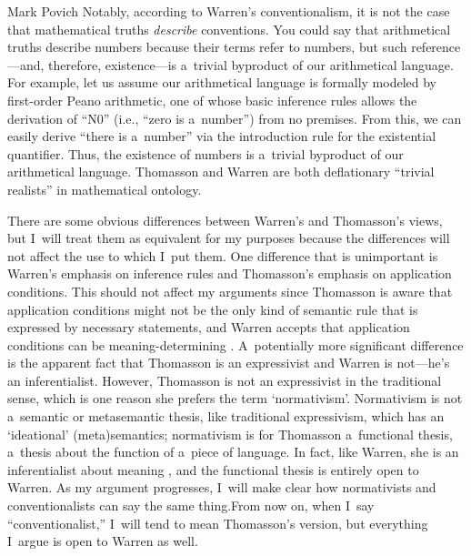 \begin{artengenv}{Mark Povich}
Notably, according to Warren's
\parencite*[][]{warren_shadows_2020} %
 conventionalism, it is not the case that mathematical truths \textit{describe} conventions. You could say that arithmetical truths describe numbers because their terms refer to numbers, but such reference---and, therefore, existence---is a~trivial byproduct of our arithmetical language. For example, let us assume our arithmetical language is formally modeled by first-order Peano arithmetic, one of whose basic inference rules allows the derivation of ``N0'' (i.e., ``zero is a~number'') from no premises. From this, we can easily derive ``there is a~number'' via the introduction rule for the existential quantifier. Thus, the existence of numbers is a~trivial byproduct of our arithmetical language. Thomasson and Warren are both deflationary ``trivial realists'' in mathematical ontology.

There are some obvious differences between Warren's and Thomasson's views, but I~will treat them as equivalent for my purposes because the differences will not affect the use to which I~put them. One difference that is unimportant is Warren's emphasis on inference rules and Thomasson's emphasis on application conditions. This should not affect my arguments since Thomasson is aware that application conditions might not be the only kind of semantic rule that is expressed by necessary statements, and Warren accepts that application conditions can be meaning-determining
\parencite[][]{warren_inferentialism_2022}. %
 A~potentially more significant difference is the apparent fact that Thomasson is an expressivist and Warren is not---he's an inferentialist. However, Thomasson is not an expressivist in the traditional sense, which is one reason she prefers the term ‘normativism'. Normativism is not a~semantic or metasemantic thesis, like traditional expressivism, which has an ‘ideational' (meta)semantics; normativism is for Thomasson a~functional thesis, a~thesis about the function of a~piece of language. In fact, like Warren, she is an inferentialist about meaning 
\parencite[][p.79]{thomasson_norms_2020}, %
 and the functional thesis is entirely open to Warren. As my argument progresses, I~will make clear how normativists and conventionalists can say the same thing.From now on, when I~say ``conventionalist,'' I~will tend to mean Thomasson's version, but everything I~argue is open to Warren as well.


\end{artengenv}
